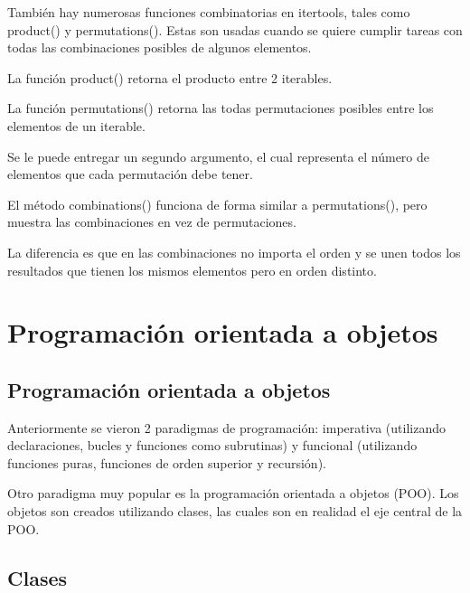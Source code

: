 \documentclass{report}
\begin{document}
También hay numerosas funciones combinatorias en itertools, tales como product() y permutations(). Estas son usadas cuando se quiere cumplir tareas con todas las combinaciones posibles de algunos elementos.\smallskip

La función product() retorna el producto entre 2 iterables.


La función permutations() retorna las todas permutaciones posibles entre los elementos de un iterable.



Se le puede entregar un segundo argumento, el cual representa el número de elementos que cada permutación debe tener.


El método combinations() funciona de forma similar a permutations(), pero muestra las combinaciones en vez de permutaciones.


La diferencia es que en las combinaciones no importa el orden y se unen todos los resultados que tienen los mismos elementos pero en orden distinto.

\clearpage\chapter{Programación orientada a objetos}


\section{Programación orientada a objetos}

Anteriormente se vieron 2 paradigmas de programación: imperativa (utilizando declaraciones, bucles y funciones como subrutinas) y funcional (utilizando funciones puras, funciones de orden superior y recursión).\smallskip

Otro paradigma muy popular es la programación orientada a objetos (POO). Los objetos son creados utilizando clases, las cuales son en realidad el eje central de la POO.

\section{Clases}
\end{document}
